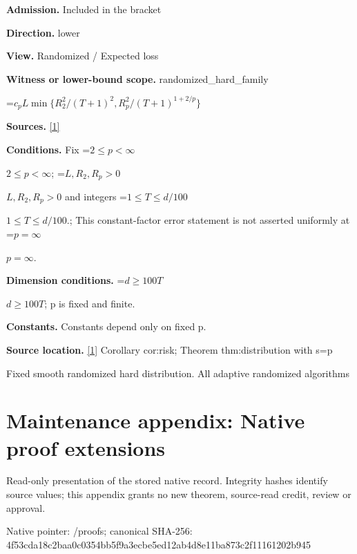 \documentclass[10pt,a4paper]{article}
\newcommand{\AtlasMath}[1]{\par\begingroup\centering\setbox0=\hbox{$\displaystyle #1$}\ifdim\wd0>1.4\linewidth\typeout{ATLAS WIDE FORMULA: \the\wd0}\fi\ifdim\wd0>\linewidth\resizebox{\linewidth}{!}{\box0}\else\box0\fi\par\endgroup}
\newcommand{\AtlasInlineMath}[1]{\begingroup\setbox0=\hbox{$#1$}\ifdim\wd0>.4\linewidth\endgroup\AtlasMath{#1}\else\endgroup$#1$\fi}
\begin{document}
\textbf{Admission.} Included in the bracket



\textbf{Direction.} lower



\textbf{View.} Randomized / Expected loss



\textbf{Witness or lower-bound scope.} randomized\_hard\_family



\AtlasMath{c_pL\min\{R_2^2/(T+1)^2,R_p^2/(T+1)^{1+2/p}\}}


\textbf{Sources.} \href{https://github.com/WU-Wendao/Colombo/blob/main/colombo_sensorium/Complexity_altas/data/sources/colombo/U02/manuscript.pdf}{[1]}



\textbf{Conditions.} Fix \AtlasInlineMath{2\le p<\infty}; \AtlasInlineMath{L,R_2,R_p>0} and integers \AtlasInlineMath{1\le T\le d/100}.; This constant-factor error statement is not asserted uniformly at \AtlasInlineMath{p=\infty}.



\textbf{Dimension conditions.} \AtlasInlineMath{d\ge100T}; p is fixed and finite.



\textbf{Constants.} Constants depend only on fixed p.



\textbf{Source location.} \href{https://github.com/WU-Wendao/Colombo/blob/main/colombo_sensorium/Complexity_altas/data/sources/colombo/U02/manuscript.pdf}{[1]} Corollary cor:risk; Theorem thm:distribution with s=p



Fixed smooth randomized hard distribution. All adaptive randomized algorithms



\section{Maintenance appendix: Native proof extensions}


Read-only presentation of the stored native record. Integrity hashes identify source values; this appendix grants no new theorem, source-read credit, review or approval.



Native pointer: /proofs; canonical SHA-256: 4f53cda18c2baa0c0354bb5f\allowbreak{}9a3ecbe5ed12ab4d8e11ba87\allowbreak{}3c2f11161202b945
\end{document}
